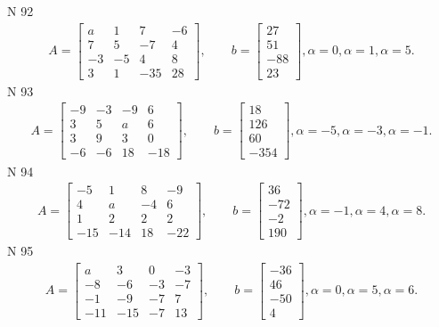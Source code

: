 \documentclass[11pt]{report}
\begin{document}
N 92
\begin{align*}
 A = \left[\begin{matrix}a & 1 & 7 & -6\\7 & 5 & -7 & 4\\-3 & -5 & 4 & 8\\3 & 1 & -35 & 28\end{matrix}\right],
    \qquad b = \left[\begin{matrix}27\\51\\-88\\23\end{matrix}\right], \alpha = 0, \alpha = 1, \alpha = 5. 
 \end{align*}
N 93
\begin{align*}
 A = \left[\begin{matrix}-9 & -3 & -9 & 6\\3 & 5 & a & 6\\3 & 9 & 3 & 0\\-6 & -6 & 18 & -18\end{matrix}\right],
    \qquad b = \left[\begin{matrix}18\\126\\60\\-354\end{matrix}\right], \alpha = -5, \alpha = -3, \alpha = -1. 
 \end{align*}
N 94
\begin{align*}
 A = \left[\begin{matrix}-5 & 1 & 8 & -9\\4 & a & -4 & 6\\1 & 2 & 2 & 2\\-15 & -14 & 18 & -22\end{matrix}\right],
    \qquad b = \left[\begin{matrix}36\\-72\\-2\\190\end{matrix}\right], \alpha = -1, \alpha = 4, \alpha = 8. 
 \end{align*}
N 95
\begin{align*}
 A = \left[\begin{matrix}a & 3 & 0 & -3\\-8 & -6 & -3 & -7\\-1 & -9 & -7 & 7\\-11 & -15 & -7 & 13\end{matrix}\right],
    \qquad b = \left[\begin{matrix}-36\\46\\-50\\4\end{matrix}\right], \alpha = 0, \alpha = 5, \alpha = 6. 
 \end{align*}
\end{document}
